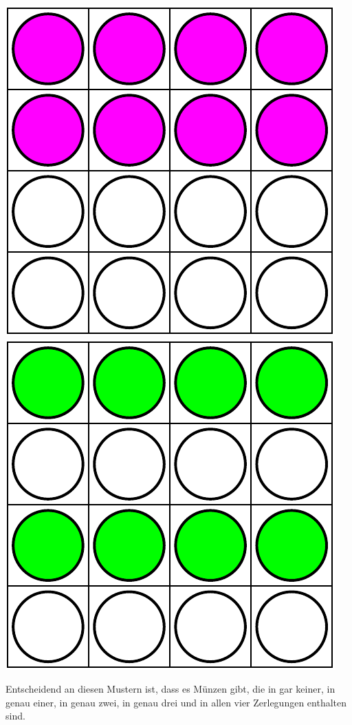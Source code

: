 \documentclass{../../../zirkelblatt}
\begin{document}
\begin{center}
 \includegraphics[scale=0.4]{zerlegung3}\hspace*{3mm}
 \includegraphics[scale=0.4]{zerlegung4}
\end{center}

Entscheidend an diesen Mustern ist, dass es Münzen gibt, die in gar keiner, in
genau einer, in genau zwei, in genau drei und in allen vier Zerlegungen
enthalten sind.
\end{document}
